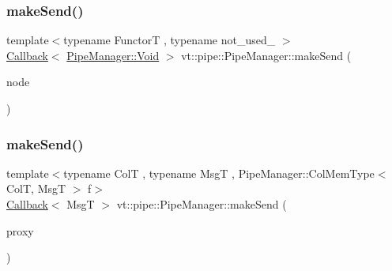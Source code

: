 \mbox{\label{structvt_1_1pipe_1_1_pipe_manager_a89f95b27b13c69f2fe84dc29fd604082}} 
\subsubsection{\texorpdfstring{make\+Send()}{makeSend()}\hspace{0.1cm}{\footnotesize\ttfamily [3/6]}}
{\footnotesize\ttfamily template$<$typename FunctorT , typename not\+\_\+used\+\_\+ $>$ \\
\hyperlink{namespacevt_a36db99df4c973d48b1118a293fff533f}{Callback}$<$ \hyperlink{structvt_1_1pipe_1_1_pipe_manager_ab720c2580ecfd3ab36e49aeaaff64cc6}{Pipe\+Manager\+::\+Void} $>$ vt\+::pipe\+::\+Pipe\+Manager\+::make\+Send (\begin{DoxyParamCaption}\item[{\hyperlink{namespacevt_a866da9d0efc19c0a1ce79e9e492f47e2}{Node\+Type} const \&}]{node }\end{DoxyParamCaption})}

\mbox{\label{structvt_1_1pipe_1_1_pipe_manager_a612b59953b949edc575577e313e3b187}} 
\subsubsection{\texorpdfstring{make\+Send()}{makeSend()}\hspace{0.1cm}{\footnotesize\ttfamily [4/6]}}
{\footnotesize\ttfamily template$<$typename ColT , typename MsgT , Pipe\+Manager\+::\+Col\+Mem\+Type$<$ Col\+T, Msg\+T $>$ f$>$ \\
\hyperlink{namespacevt_a36db99df4c973d48b1118a293fff533f}{Callback}$<$ MsgT $>$ vt\+::pipe\+::\+Pipe\+Manager\+::make\+Send (\begin{DoxyParamCaption}\item[{typename Col\+T\+::\+Proxy\+Type}]{proxy }\end{DoxyParamCaption})}

\mbox{\label{structvt_1_1pipe_1_1_pipe_manager_a87e25e6a0151c0a9a48b58e6f4679b02}} 
